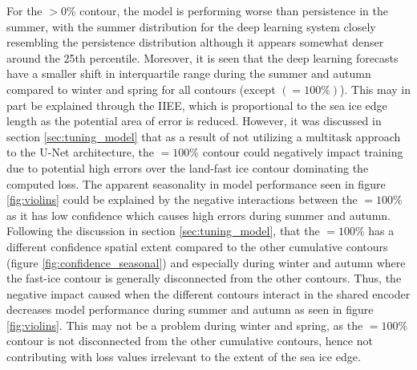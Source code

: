 \documentclass[../main/thesis]{subfiles}
\begin{document}
For the $> 0\%$ contour, the model is performing worse than persistence in the summer, with the summer distribution for the deep learning system closely resembling the persistence distribution although it appears somewhat denser around the 25th percentile. Moreover, it is seen that the deep learning forecasts have a smaller shift in interquartile range during the summer and autumn compared to winter and spring for all contours (except $(=100\%)$). This may in part be explained through the IIEE, which is proportional to the sea ice edge length \cite{Goessling2016} as the potential area of error is reduced. However, it was discussed in section \ref{sec:tuning_model} that as a result of not utilizing a multitask approach to the U-Net architecture, the $=100\%$ contour could negatively impact training due to potential high errors over the land-fast ice contour dominating the computed loss. The apparent seasonality in model performance seen in figure \ref{fig:violins} could be explained by the negative interactions between the $=100\%$ as it has low confidence which causes high errors during summer and autumn. Following the discussion in section \ref{sec:tuning_model}, that the $=100\%$ has a different confidence spatial extent compared to the other cumulative contours (figure \ref{fig:confidence_seasonal}) and especially during winter and autumn where the fast-ice contour is generally disconnected from the other contours. Thus, the negative impact caused when the different contours interact in the shared encoder decreases model performance during summer and autumn as seen in figure \ref{fig:violins}. This may not be a problem during winter and spring, as the $=100\%$ contour is not disconnected from the other cumulative contours, hence not contributing with loss values irrelevant to the extent of the sea ice edge.
\end{document}

